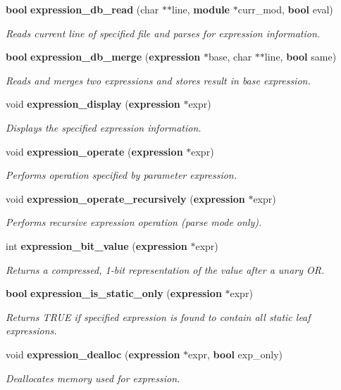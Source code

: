 \begin{CompactItemize}
{\bf bool} {\bf expression\_\-db\_\-read} (char $\ast$$\ast$line, {\bf module} $\ast$curr\_\-mod, {\bf bool} eval)
\begin{CompactList}\small\item\em Reads current line of specified file and parses for expression information. \item\end{CompactList}\item 
{\bf bool} {\bf expression\_\-db\_\-merge} ({\bf expression} $\ast$base, char $\ast$$\ast$line, {\bf bool} same)
\begin{CompactList}\small\item\em Reads and merges two expressions and stores result in base expression. \item\end{CompactList}\item 
void {\bf expression\_\-display} ({\bf expression} $\ast$expr)
\begin{CompactList}\small\item\em Displays the specified expression information. \item\end{CompactList}\item 
void {\bf expression\_\-operate} ({\bf expression} $\ast$expr)
\begin{CompactList}\small\item\em Performs operation specified by parameter expression. \item\end{CompactList}\item 
void {\bf expression\_\-operate\_\-recursively} ({\bf expression} $\ast$expr)
\begin{CompactList}\small\item\em Performs recursive expression operation (parse mode only). \item\end{CompactList}\item 
int {\bf expression\_\-bit\_\-value} ({\bf expression} $\ast$expr)
\begin{CompactList}\small\item\em Returns a compressed, 1-bit representation of the value after a unary OR. \item\end{CompactList}\item 
{\bf bool} {\bf expression\_\-is\_\-static\_\-only} ({\bf expression} $\ast$expr)
\begin{CompactList}\small\item\em Returns TRUE if specified expression is found to contain all static leaf expressions. \item\end{CompactList}\item 
void {\bf expression\_\-dealloc} ({\bf expression} $\ast$expr, {\bf bool} exp\_\-only)
\begin{CompactList}\small\item\em Deallocates memory used for expression. \item\end{CompactList}\end{CompactItemize}

